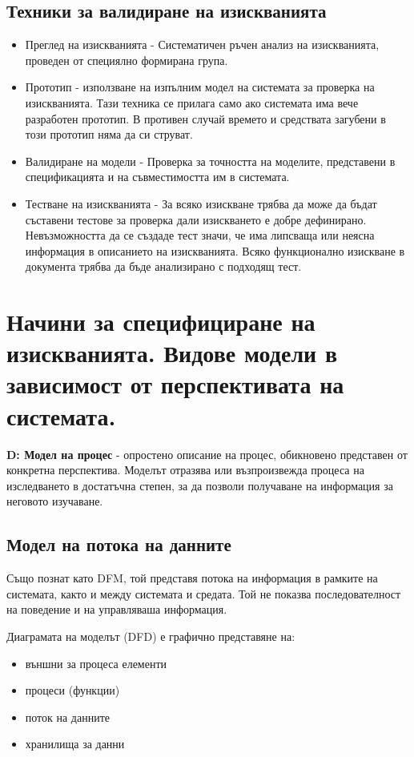 \documentclass[fleqn,12pt]{article}
\begin{document}
\subsection{Техники за валидиране на изискванията}

\begin{itemize}
	\item Преглед на изискванията - Систематичен ръчен анализ на изискванията, проведен от специялно формирана група.
	\item Прототип - използване на изпълним модел на системата за проверка на изискванията. Тази техника се прилага само ако системата има вече разработен прототип. В противен случай времето и средствата загубени в този прототип няма да си струват.
	\item Валидиране на модели - Проверка за точността на моделите, представени в спецификацията и на съвместимостта им в системата.
	\item Тестване на изискванията - За всяко изискване трябва да може да бъдат съставени тестове за проверка дали изискването е добре дефинирано. Невъзможността да се създаде тест значи, че има липсваща или неясна информация в описанието на изискванията. Всяко функционално изискване в документа трябва да бъде анализирано с подходящ тест.
\end{itemize}

\section{Начини за специфициране на изискванията. Видове модели в зависимост от перспективата  на  системата.}
\textbf{D: Модел на процес} - опростено описание на процес, обикновено представен от конкретна перспектива. Моделът отразява или възпроизвежда процеса на изследването в достатъчна степен, за да позволи получаване на информация за неговото изучаване.

\subsection{Модел  на  потока  на  данните}
Също познат като DFM, той представя потока на информация в рамките на системата, както и между системата и средата. Той не показва последователност на поведение и на управляваша информация.

Диаграмата на моделът (DFD) е графично представяне на:
\begin{itemize}
	\item външни за процеса елементи
	\item процеси (функции)
	\item поток на данните
	\item хранилища за данни
\end{itemize}
\end{document}

